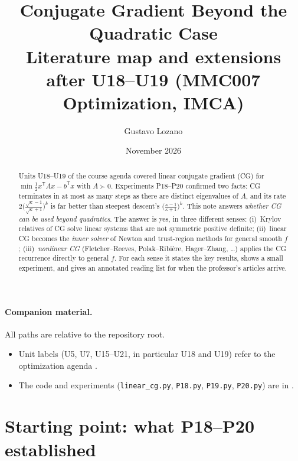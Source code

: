 \documentclass[11pt,a4paper]{article}
\title{Conjugate Gradient Beyond the Quadratic Case\\[0.3em]
\large Literature map and extensions after U18--U19 (MMC007 Optimization, IMCA)}
\author{Gustavo Lozano}
\date{November 2026}
\theoremstyle{remark}
\newcommand{\T}{^{\mathsf T}}
\begin{document}
\maketitle

\paragraph{Companion material.} All paths are relative to the repository root.
\begin{itemize}[leftmargin=1.5em,itemsep=2pt]
\item Unit labels (U5, U7, U15--U21, in particular U18 and U19) refer to the optimization agenda
.
\item The code and experiments (\texttt{linear\_cg.py}, \texttt{P18.py}, \texttt{P19.py}, \texttt{P20.py}) are in
.
\end{itemize}


\begin{abstract}
Units U18--U19 of the course agenda covered linear conjugate gradient (CG) for $\min \tfrac12 x\T Ax - b\T x$ with $A\succ 0$. Experiments P18--P20 confirmed two facts: CG terminates in at most as many steps as there are distinct eigenvalues of $A$, and its rate $2\bigl(\tfrac{\sqrt\kappa-1}{\sqrt\kappa+1}\bigr)^k$ is far better than steepest descent's $\bigl(\tfrac{\kappa-1}{\kappa+1}\bigr)^k$. This note answers \emph{whether CG can be used beyond quadratics}. The answer is yes, in three different senses: (i)~Krylov relatives of CG solve linear systems that are not symmetric positive definite; (ii)~linear CG becomes the \emph{inner solver} of Newton and trust-region methods for general smooth $f$; (iii)~\emph{nonlinear CG} (Fletcher--Reeves, Polak--Ribi\`ere, Hager--Zhang, \dots) applies the CG recurrence directly to general $f$. For each sense it states the key results, shows a small experiment, and gives an annotated reading list for when the professor's articles arrive.
\end{abstract}

\tableofcontents



\section{Starting point: what P18--P20 established}
\end{document}
